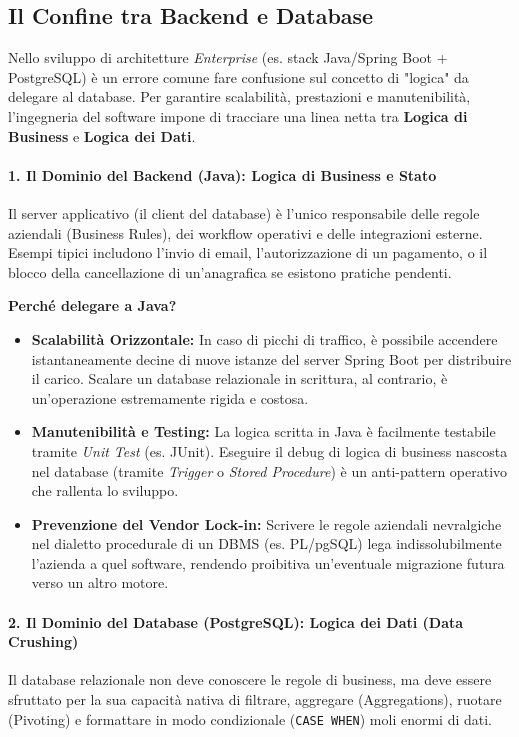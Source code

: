 \subsection{Il Confine tra Backend e Database}

Nello sviluppo di architetture \textit{Enterprise} (es. stack Java/Spring Boot + PostgreSQL) è un errore comune fare confusione sul concetto di "logica" da delegare al database. Per garantire scalabilità, prestazioni e manutenibilità, l'ingegneria del software impone di tracciare una linea netta tra \textbf{Logica di Business} e \textbf{Logica dei Dati}.

\paragraph{1. Il Dominio del Backend (Java): Logica di Business e Stato}
Il server applicativo (il client del database) è l'unico responsabile delle regole aziendali (Business Rules), dei workflow operativi e delle integrazioni esterne.
Esempi tipici includono l'invio di email, l'autorizzazione di un pagamento, o il blocco della cancellazione di un'anagrafica se esistono pratiche pendenti.

\textbf{Perché delegare a Java?}
\begin{itemize}
    \item \textbf{Scalabilità Orizzontale:} In caso di picchi di traffico, è possibile accendere istantaneamente decine di nuove istanze del server Spring Boot per distribuire il carico. Scalare un database relazionale in scrittura, al contrario, è un'operazione estremamente rigida e costosa.
    \item \textbf{Manutenibilità e Testing:} La logica scritta in Java è facilmente testabile tramite \textit{Unit Test} (es. JUnit). Eseguire il debug di logica di business nascosta nel database (tramite \textit{Trigger} o \textit{Stored Procedure}) è un anti-pattern operativo che rallenta lo sviluppo.
    \item \textbf{Prevenzione del Vendor Lock-in:} Scrivere le regole aziendali nevralgiche nel dialetto procedurale di un DBMS (es. PL/pgSQL) lega indissolubilmente l'azienda a quel software, rendendo proibitiva un'eventuale migrazione futura verso un altro motore.
\end{itemize}

\paragraph{2. Il Dominio del Database (PostgreSQL): Logica dei Dati (Data Crushing)}
Il database relazionale non deve conoscere le regole di business, ma deve essere sfruttato per la sua capacità nativa di filtrare, aggregare (Aggregations), ruotare (Pivoting) e formattare in modo condizionale (\texttt{CASE WHEN}) moli enormi di dati.

